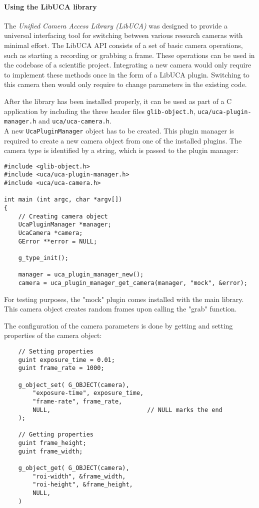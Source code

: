 \paragraph{Using the LibUCA library}
The \textit{Unified Camera Access Library (LibUCA)} was designed to provide a universal interfacing tool for switching between various research cameras with minimal effort. The LibUCA API consists of a set of basic camera operations, such as starting a recording or grabbing a frame. These operations can be used in the codebase of a scientific project. Integrating a new camera would only require to implement these methods once in the form of a LibUCA plugin. Switching to this camera then would only require to change parameters in the existing code.\par
After the library has been installed properly, it can be used as part of a C application by including the three header files \texttt{glib-object.h}, \texttt{uca/uca-plugin-manager.h} and \texttt{uca/uca-camera.h}.\\
A new \texttt{UcaPluginManager} object has to be created. This plugin manager is required to create a new camera object from one of the installed plugins. The camera type is identified by a string, which is passed to the plugin manager:
\lstset{language=C}
\begin{lstlisting}
#include <glib-object.h>
#include <uca/uca-plugin-manager.h>
#include <uca/uca-camera.h>

int main (int argc, char *argv[])
{
	// Creating camera object
	UcaPluginManager *manager;
	UcaCamera *camera;
	GError **error = NULL;
	
	g_type_init();
	
	manager = uca_plugin_manager_new();
	camera = uca_plugin_manager_get_camera(manager, "mock", &error);
\end{lstlisting} 
For testing purposes, the "mock" plugin comes installed with the main library. This camera object creates random frames upon calling the "grab" function.\par
The configuration of the camera parameters is done by getting and setting properties of the camera object:
\begin{lstlisting}
	// Setting properties	
	guint exposure_time = 0.01;
	guint frame_rate = 1000;
	
	g_object_set( G_OBJECT(camera),
		"exposure-time", exposure_time,
		"frame-rate", frame_rate,
		NULL,							// NULL marks the end		 
	);	
		
	// Getting properties
	guint frame_height;
	guint frame_width;
	
	g_object_get( G_OBJECT(camera),
		"roi-width", &frame_width,
		"roi-height", &frame_height,
		NULL,
	)	
\end{lstlisting}
